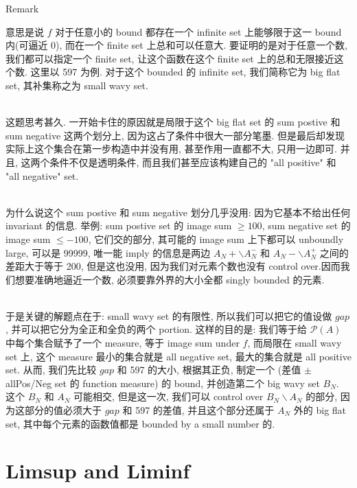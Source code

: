 \begin{qlremark}{Remark}

意思是说 \(f\) 对于任意小的 bound 都存在一个 infinite set 上能够限于这一 bound 内(可逼近 0), 而在一个 finite set 上总和可以任意大. 要证明的是对于任意一个数, 我们都可以指定一个 finite set, 让这个函数在这个 finite set 上的总和无限接近这个数. 这里以 597 为例. 对于这个 bounded 的 infinite set, 我们简称它为 big flat set, 其补集称之为 small wavy set.\\
\strut \\
这题思考甚久. 一开始卡住的原因就是局限于这个 big flat set 的 sum postive 和 sum negative 这两个划分上, 因为这占了条件中很大一部分笔墨. 但是最后却发现实际上这个集合在第一步构造中并没有用, 甚至作用一直都不大, 只用一边即可. 并且, 这两个条件不仅是透明条件, 而且我们甚至应该构建自己的 "all positive" 和 "all negative" set.\\
\strut \\
为什么说这个 sum postive 和 sum negative 划分几乎没用: 因为它基本不给出任何 invariant 的信息. 举例: sum postive set 的 image sum \(\geq 100\), sum negative set 的 image sum \(\leq - 100\), 它们交的部分, 其可能的 image sum 上下都可以 unboundly large, 可以是 99999, 唯一能 imply 的信息是两边 \(A_{N} + \backslash A_{N}^{-}\) 和 \(A_{N} - \backslash A_{N}^{+}\) 之间的差距大于等于 200, 但是这也没用, 因为我们对元素个数也没有 control over.因而我们想要准确地逼近一个数, 必须要靠外界的大小全都 singly bounded 的元素.\\
\strut \\
于是关键的解题点在于: small wavy set 的有限性, 所以我们可以把它的值设做 \(gap\), 并可以把它分为全正和全负的两个 portion. 这样的目的是: 我们等于给 \(\mathcal{P}(A)\) 中每个集合赋予了一个 measure, 等于 image sum under \(f\), 而局限在 small wavy set 上, 这个 measure 最小的集合就是 all negative set, 最大的集合就是 all positive set. 从而, 我们先比较 \(gap\) 和 597 的大小, 根据其正负, 制定一个 (差值 \(\pm\) allPos/Neg set 的 function measure) 的 bound, 并创造第二个 big wavy set \(B_{N}\). 这个 \(B_{N}\) 和 \(A_{N}\) 可能相交, 但是这一次, 我们可以 control over \(B_{N}\backslash A_{N}\) 的部分, 因为这部分的值必须大于 \(gap\) 和 597 的差值, 并且这个部分还属于 \(A_{N}\) 外的 big flat set, 其中每个元素的函数值都是 bounded by a small number 的.

\end{qlremark}

\section{Limsup and Liminf}\label{limsup-and-liminf}

